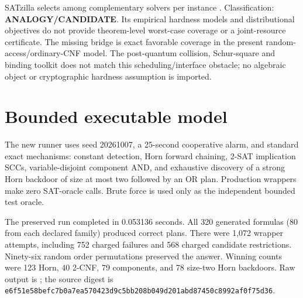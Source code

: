 \documentclass[11pt]{article}
\begin{document}
SATzilla selects among complementary solvers per instance
\cite{xu2008}.  Classification: \textbf{ANALOGY/CANDIDATE}.  Its empirical
hardness models and distributional objectives do not provide theorem-level
worst-case coverage or a joint-resource certificate.  The missing bridge is
exact favorable coverage in the present random-access/ordinary-CNF model.
The post-quantum collision, Schur-square and binding toolkit does not match
this scheduling/interface obstacle; no algebraic object or cryptographic
hardness assumption is imported.

\section*{Bounded executable model}
The new runner
 uses
seed 20261007, a 25-second cooperative alarm, and standard exact mechanisms:
constant detection, Horn forward chaining, 2-SAT implication SCCs,
variable-disjoint component AND, and exhaustive discovery of a strong Horn
backdoor of size at most two followed by an OR plan.  Production wrappers make
zero SAT-oracle calls.  Brute force is used only as the independent bounded
test oracle.

The preserved run completed in 0.053136 seconds.  All 320 generated formulas
(80 from each declared family) produced correct plans.  There were 1,072
wrapper attempts, including 752 charged failures and 568 charged candidate
restrictions.  Ninety-six random order permutations preserved the answer.
Winning counts were 123 Horn, 40 2-CNF, 79 components, and 78 size-two Horn
backdoors.  Raw output is
;
the source digest is
\texttt{e6f51e58befc7b0a7ea570423d9c5bb208b049d201abd87450c8992af0f75d36}.
\end{document}
